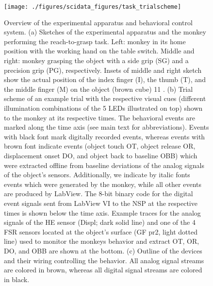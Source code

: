 {\begin{figure}
 \texttt{[image: ./figures/scidata\_figures/task\_trialscheme]}
 \caption[Overview of the experimental apparatus and behavioral control system.]{Overview of the experimental apparatus and behavioral control system. (a) Sketches of the experimental apparatus and the monkey performing the reach-to-grasp task. Left: monkey in its home position with the working hand on the table switch. Middle and right: monkey grasping the object with a side grip (SG) and a precision grip (PG), respectively. Insets of middle and right sketch show the actual position of the index finger (I), the thumb (T), and the middle finger (M) on the object (brown cube) 11 . (b) Trial scheme of an example trial with
the respective visual cues (different illumination combinations of the 5 LEDs illustrated on top) shown to the monkey at its respective times. The behavioral events are marked along the time axis (see main text for abbreviations). Events with black font mark digitally recorded events, whereas events with brown font indicate events (object touch OT, object release OR, displacement onset DO, and object back to baseline OBB) which were extracted offline from baseline deviations of the analog signals of the object’s sensors. Additionally, we indicate by italic fonts events which were generated by the monkey, while all other events are produced by LabView. The 8-bit binary code for the digital event signals sent from LabView VI to the NSP at the respective times is shown below the time axis. Example traces for the analog signals of the HE sensor (Displ; dark solid line) and one of the 4 FSR sensors located at the object’s surface (GF pr2, light dotted line) used to monitor the monkeys behavior and extract
OT, OR, DO, and OBB are shown at the bottom. (c) Outline of the devices and their wiring controlling the behavior. All analog signal streams are colored in brown, whereas all digital signal streams are colored in black.}
\label{fig:task_trialscheme}
\end{figure}


}
